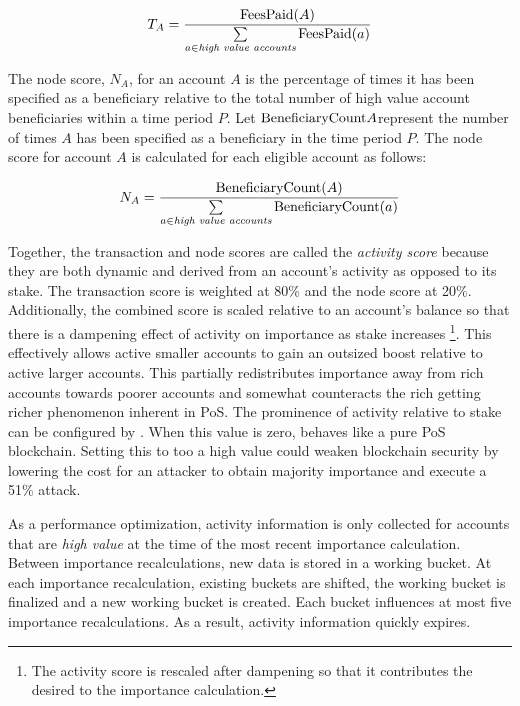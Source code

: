 \begin{equation}
T_A = \frac{\mathrm{FeesPaid}(A)}{\sum\limits_{\substack{a \in \textit{high value accounts}}} \mathrm{FeesPaid}(a)}
\end{equation}

The node score, $N_A$, for an account $A$ is the percentage of times it has been specified as a beneficiary relative to the total number of high value account beneficiaries within a time period $P$.
Let $\mathrm{BeneficiaryCount}{A}$represent the number of times $A$ has been specified as a beneficiary in the time period $P$.
The node score for account $A$ is calculated for each eligible account as follows:

\begin{equation}
N_A = \frac{\mathrm{BeneficiaryCount}(A)}{\sum\limits_{\substack{a \in \textit{high value accounts}}} \mathrm{BeneficiaryCount}(a)}
\end{equation}

Together, the transaction and node scores are called the \emph{activity score} because they are both dynamic and derived from an account's activity as opposed to its stake.
The transaction score is weighted at 80\% and the node score at 20\%.
Additionally, the combined score is scaled relative to an account's balance so that there is a dampening effect of activity on importance as stake increases
\footnote{The activity score is rescaled after dampening so that it contributes the desired  to the importance calculation.}.
This effectively allows active smaller accounts to gain an outsized boost relative to active larger accounts.
This partially redistributes importance away from rich accounts towards poorer accounts and somewhat counteracts the rich getting richer phenomenon inherent in PoS.
The prominence of activity relative to stake can be configured by .
When this value is zero, \codenamespace behaves like a pure PoS blockchain.
Setting this to too a high value could weaken blockchain security by lowering the cost for an attacker to obtain majority importance and execute a 51\% attack.

As a performance optimization, activity information is only collected for accounts that are \emph{high value} at the time of the most recent importance calculation.
Between importance recalculations, new data is stored in a working bucket.
At each importance recalculation, existing buckets are shifted, the working bucket is finalized and a new working bucket is created.
Each bucket influences at most five importance recalculations.
As a result, activity information quickly expires.

